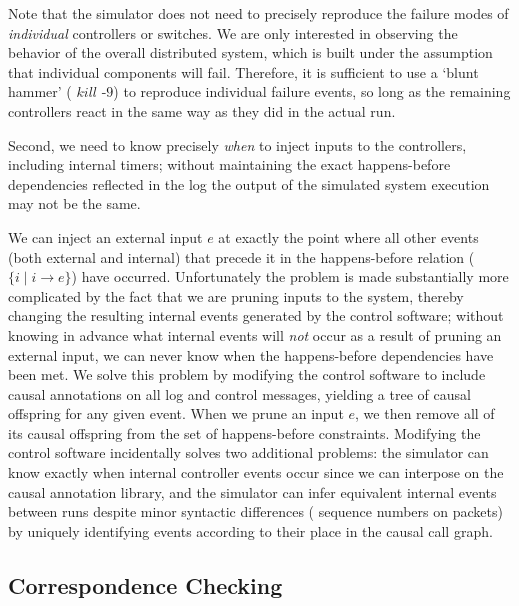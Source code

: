 Note that the simulator does not need
to precisely reproduce the failure modes of {\em individual} controllers or switches.
We are only interested in observing the behavior of the overall distributed system, which is
built under the assumption that individual components will fail.
Therefore, it is sufficient to use a `blunt hammer' (\eg{}
$kill \text{ -}9$) to reproduce individual
failure events, so long as the remaining controllers react in the same
way as they did in the actual run.

Second, we need to know precisely {\em when} to inject inputs to the controllers,
including internal timers; without maintaining the exact happens-before dependencies reflected in the
log the output of the simulated system execution may not be the same.

We can inject an external input $e$ at exactly the point where all other
events (both external and internal) that precede it in the happens-before
relation ($\{i \mid i \rightarrow e\}$) have occurred. Unfortunately the problem is made
substantially more complicated by the fact that we are pruning inputs to the
system, thereby changing the resulting internal events generated by the control
software; without knowing in advance what internal events will {\em not} occur
as a result of pruning an external input, we can never know when the happens-before
dependencies have
been met. We solve this problem by modifying the control software to include causal
annotations on all log and control messages, yielding a tree of
causal offspring for any given event. When we prune an input $e$, we then remove
all of its causal offspring from the set of
happens-before constraints. Modifying the control software incidentally solves two
additional problems: the simulator can know exactly when internal controller events
occur since we can interpose on the causal annotation library, and
the simulator can infer equivalent internal events between runs despite minor
syntactic differences (\eg{} sequence numbers on packets) by
uniquely identifying events according to their place in the causal call graph.


\subsection{Correspondence Checking}

